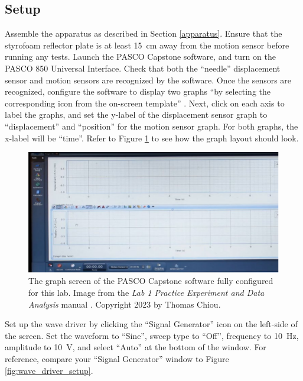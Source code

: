 \documentclass[12 pt]{report}
\begin{document}
\subsection{Setup} \label{procedures-setup}
Assemble the apparatus as described in Section \ref{apparatus}. Ensure that the styrofoam reflector plate is at least \qty{15}{\cm} away from the motion sensor before running any tests. Launch the PASCO Capstone software, and turn on the PASCO 850 Universal Interface. Check that both the ``needle'' displacement sensor and motion sensors are recognized by the software. Once the sensors are recognized, configure the software to display two graphs ``by selecting the corresponding icon from the on-screen template'' \cite{lab_procedures}. Next, click on each axis to label the graphs, and set the y-label of the displacement sensor graph to ``displacement'' and ``position'' for the motion sensor graph. For both graphs, the x-label will be ``time''. Refer to Figure \ref{fig:pasco_main_page} to see how the graph layout should look.

\begin{figure}[htbp]
\centering
\includegraphics[width=5in]{images/PASCO_Main_Page}
\caption{The graph screen of the PASCO Capstone software fully configured for this lab. Image from the \textit{Lab 1 Practice Experiment and Data Analysis} manual \cite{lab_procedures}. Copyright 2023 by Thomas Chiou.}
\label{fig:pasco_main_page}
\end{figure}

Set up the wave driver by clicking the ``Signal Generator'' icon on the left-side of the screen.  Set the waveform to ``Sine'', sweep type to ``Off'', frequency to \qty{10}{\hertz}, amplitude to \qty{10}{\volt}, and select ``Auto'' at the bottom of the window. For reference, compare your ``Signal Generator'' window to Figure \ref{fig:wave_driver_setup}.
\end{document}
